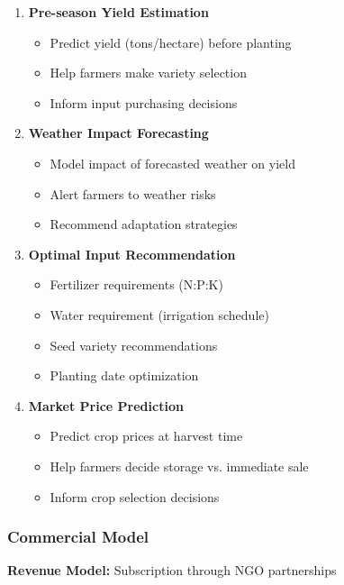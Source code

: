 \begin{enumerate}
    \item \textbf{Pre-season Yield Estimation}
        \begin{itemize}
            \item Predict yield (tons/hectare) before planting
            \item Help farmers make variety selection
            \item Inform input purchasing decisions
        \end{itemize}

    \item \textbf{Weather Impact Forecasting}
        \begin{itemize}
            \item Model impact of forecasted weather on yield
            \item Alert farmers to weather risks
            \item Recommend adaptation strategies
        \end{itemize}

    \item \textbf{Optimal Input Recommendation}
        \begin{itemize}
            \item Fertilizer requirements (N:P:K)
            \item Water requirement (irrigation schedule)
            \item Seed variety recommendations
            \item Planting date optimization
        \end{itemize}

    \item \textbf{Market Price Prediction}
        \begin{itemize}
            \item Predict crop prices at harvest time
            \item Help farmers decide storage vs. immediate sale
            \item Inform crop selection decisions
        \end{itemize}
\end{enumerate}

\subsubsection{Commercial Model}

\textbf{Revenue Model:} Subscription through NGO partnerships


